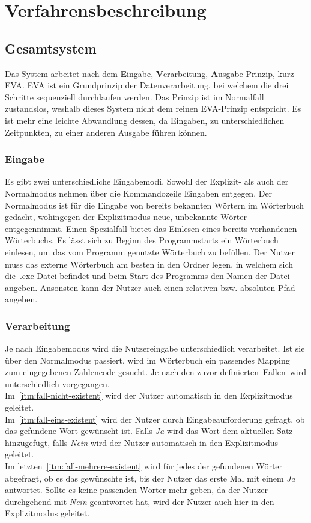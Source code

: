 \chapter{Verfahrensbeschreibung}\label{ch:verfahrensbeschreibung}


\section{Gesamtsystem}\label{sec:gesamtsystem}
Das System arbeitet nach dem \textbf{E}ingabe, \textbf{V}erarbeitung, \textbf{A}usgabe-Prinzip, kurz EVA.
EVA ist ein Grundprinzip der Datenverarbeitung, bei welchem die drei Schritte sequenziell durchlaufen werden.
Das Prinzip ist im Normalfall zustandslos, weshalb dieses System nicht dem reinen EVA-Prinzip entspricht.
Es ist mehr eine leichte Abwandlung dessen, da Eingaben, zu unterschiedlichen Zeitpunkten, zu einer anderen Ausgabe führen können.

\subsection{Eingabe}\label{subsec:eingabe}
Es gibt zwei unterschiedliche Eingabemodi.
Sowohl der Explizit- als auch der Normalmodus nehmen über die Kommandozeile Eingaben entgegen.
Der Normalmodus ist für die Eingabe von bereits bekannten Wörtern im Wörterbuch gedacht, wohingegen der Explizitmodus neue, unbekannte Wörter entgegennimmt.
Einen Spezialfall bietet das Einlesen eines bereits vorhandenen Wörterbuchs.
Es lässt sich zu Beginn des Programmstarts ein Wörterbuch einlesen, um das vom Programm genutzte Wörterbuch zu befüllen.
Der Nutzer muss das externe Wörterbuch am besten in den Ordner legen, in welchem sich die~.exe-Datei befindet und beim Start des Programms den Namen der Datei angeben.
Ansonsten kann der Nutzer auch einen relativen bzw. absoluten Pfad angeben.

\subsection{Verarbeitung}\label{subsec:verarbeitung}
Je nach Eingabemodus wird die Nutzereingabe unterschiedlich verarbeitet.
Ist sie über den Normalmodus passiert, wird im Wörterbuch ein passendes Mapping zum eingegebenen Zahlencode gesucht.
Je nach den zuvor definierten~\hyperref[enm:faelle]{Fällen}~wird unterschiedlich vorgegangen.\\
Im~\ref{itm:fall-nicht-existent} wird der Nutzer automatisch in den Explizitmodus geleitet.\\
Im~\ref{itm:fall-eins-existent} wird der Nutzer durch Eingabeaufforderung gefragt, ob das gefundene Wort gewünscht ist.
Falls \textit{Ja} wird das Wort dem aktuellen Satz hinzugefügt, falls \textit{Nein} wird der Nutzer automatisch in den Explizitmodus geleitet.\\
Im letzten~\ref{itm:fall-mehrere-existent} wird für jedes der gefundenen Wörter abgefragt, ob es das gewünschte ist, bis der Nutzer das erste Mal mit einem \textit{Ja} antwortet.
Sollte es keine passenden Wörter mehr geben, da der Nutzer durchgehend mit \textit{Nein} geantwortet hat, wird der Nutzer auch hier in den Explizitmodus geleitet.\\


